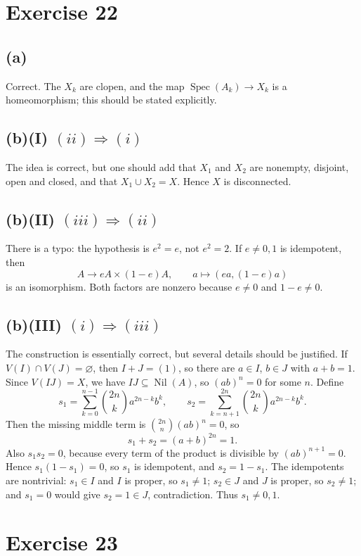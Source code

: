 \documentclass[11pt]{article}
\DeclareMathOperator{\Spec}{Spec}
\DeclareMathOperator{\Nil}{Nil}
\begin{document}
\section*{Exercise 22}

\subsection*{(a)}
Correct.  The \(X_k\) are clopen, and the map
\(\Spec(A_k)\to X_k\) is a homeomorphism; this should be stated explicitly.

\subsection*{(b)(I) \((ii)\Rightarrow(i)\)}
The idea is correct, but one should add that \(X_1\) and \(X_2\) are nonempty,
disjoint, open and closed, and that \(X_1\cup X_2=X\).  Hence \(X\) is
disconnected.

\subsection*{(b)(II) \((iii)\Rightarrow(ii)\)}
There is a typo: the hypothesis is \(e^2=e\), not \(e^2=2\).  If
\(e\neq0,1\) is idempotent, then
\[
A\longrightarrow eA\times(1-e)A,\qquad a\longmapsto(ea,(1-e)a)
\]
is an isomorphism.  Both factors are nonzero because \(e\neq0\) and
\(1-e\neq0\).

\subsection*{(b)(III) \((i)\Rightarrow(iii)\)}
The construction is essentially correct, but several details should be
justified.  If \(V(I)\cap V(J)=\varnothing\), then \(I+J=(1)\), so there are
\(a\in I\), \(b\in J\) with \(a+b=1\).  Since \(V(IJ)=X\), we have
\(IJ\subseteq\Nil(A)\), so \((ab)^n=0\) for some \(n\).  Define
\[
s_1=\sum_{k=0}^{n-1}\binom{2n}{k}a^{2n-k}b^k,\qquad
s_2=\sum_{k=n+1}^{2n}\binom{2n}{k}a^{2n-k}b^k.
\]
Then the missing middle term is
\(\binom{2n}{n}(ab)^n=0\), so
\[
s_1+s_2=(a+b)^{2n}=1.
\]
Also \(s_1s_2=0\), because every term of the product is divisible by
\((ab)^{n+1}=0\).  Hence \(s_1(1-s_1)=0\), so \(s_1\) is idempotent, and
\(s_2=1-s_1\).  The idempotents are nontrivial: \(s_1\in I\) and \(I\) is
proper, so \(s_1\neq1\); \(s_2\in J\) and \(J\) is proper, so \(s_2\neq1\);
and \(s_1=0\) would give \(s_2=1\in J\), contradiction.  Thus \(s_1\neq0,1\).

\section*{Exercise 23}
\end{document}
